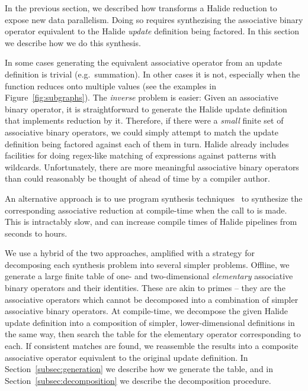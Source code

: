 In the previous section, we described how  transforms a Halide reduction to expose new data parallelism. Doing so requires synthezising the associative binary operator equivalent to the Halide \emph{update} definition being factored. In this section we describe how we do this synthesis.

In some cases generating the equivalent associative operator from an update definition is trivial (e.g.\ summation). In other cases it is not, especially when the function reduces onto multiple values (see the examples in Figure~\ref{fig:subgraphs}). The \emph{inverse} problem is easier: Given an associative binary operator, it is straightforward to generate the Halide update definition that implements reduction by it. Therefore, if there were a \emph{small} finite set of associative binary operators, we could simply attempt to match the update definition being factored against each of them in turn. Halide already includes facilities for doing regex-like matching of expressions against patterns with wildcards. Unfortunately, there are more meaningful associative binary operators than could reasonably be thought of ahead of time by a compiler author.

An alternative approach is to use program synthesis techniques~\cite{Solar-Lezama:2008:PSS:1714168, Torlak:2013:GSL:2509578.2509586} to synthesize the corresponding associative reduction at compile-time when the call to  is made. This is intractably slow, and can increase compile times of Halide pipelines from seconds to hours.

We use a hybrid of the two approaches, amplified with a strategy for decomposing each synthesis problem into several simpler problems. Offline, we generate a large finite table of one- and two-dimensional \emph{elementary} associative binary operators and their identities. These are akin to primes -- they are the associative operators which cannot be decomposed into a combination of simpler associative binary operators. At compile-time, we decompose the given Halide update definition into a composition of simpler, lower-dimensional definitions in the same way, then search the table for the elementary operator corresponding to each. If consistent matches are found, we reassemble the results into a composite associative operator equivalent to the original update definition. In Section~\ref{subsec:generation} we describe how we generate the table, and in Section~\ref{subsec:decomposition} we describe the decomposition procedure.

